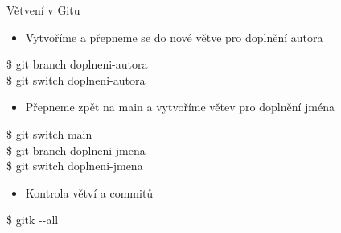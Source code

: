 \documentclass{beamer}
\begin{document}
\begin{frame}[fragile]{Větvení v Gitu}
	
	\begin{itemize}
		\item Vytvoříme a přepneme se do nové větve pro doplnění autora
	\end{itemize}
	
	{\ttfamily\small
		\$ git branch doplneni-autora \\
		\$ git switch doplneni-autora
	}
	
	\hspace{0.5cm}
	\begin{itemize}
		\item Přepneme zpět na main a vytvoříme větev pro doplnění jména
	\end{itemize}
	
	{\ttfamily\small
		\$ git switch main \\
		\$ git branch doplneni-jmena \\
		\$ git switch doplneni-jmena
	}
	
	\hspace{0.5cm}
	\begin{itemize}
		\item Kontrola větví a commitů
	\end{itemize}
	
	{\ttfamily\small
		\$ gitk {-}{-}all
	}
	
\end{frame}
	
\end{document}
